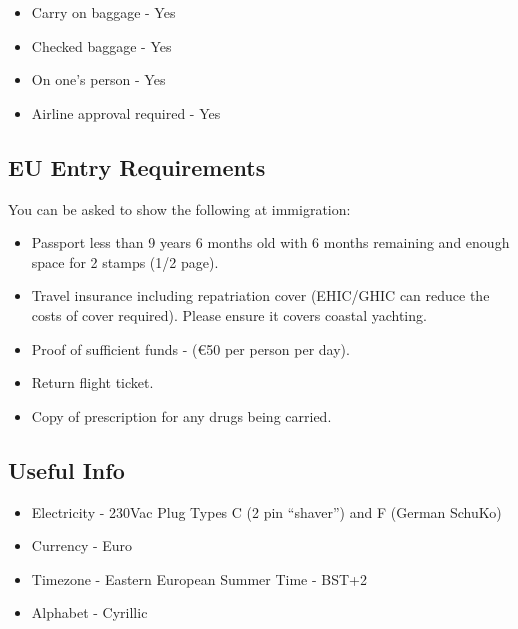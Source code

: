 \begin{itemize}
\item Carry on baggage - Yes
\item Checked baggage - Yes
\item On one's person - Yes
\item Airline approval required - Yes
\end{itemize}

\subsection*{EU Entry Requirements}
You can be asked to show the following at immigration:
\begin{itemize}
\item Passport less than 9 years 6 months old with 6 months remaining and enough space for 2 stamps (1/2 page).
\item Travel insurance including repatriation cover (EHIC/GHIC can reduce the costs of cover required).  Please ensure it covers coastal yachting. 
\item Proof of sufficient funds - (\euro{}50 per person per day).
\item Return flight ticket.
\item Copy of prescription for any drugs being carried.
\end{itemize}

\subsection*{Useful Info}
\begin{itemize}
\item Electricity - 230Vac Plug Types C (2 pin ``shaver'') and F (German SchuKo)
\item Currency - Euro
\item Timezone - Eastern European Summer Time - BST+2
\item Alphabet - Cyrillic
\end{itemize}

